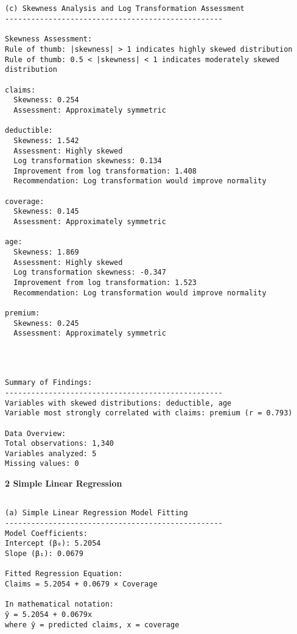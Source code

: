 \documentclass[8pt, twocolumn]{extarticle}
\begin{document}
    \begin{Verbatim}[commandchars=\\\{\}]


(c) Skewness Analysis and Log Transformation Assessment
--------------------------------------------------

Skewness Assessment:
Rule of thumb: |skewness| > 1 indicates highly skewed distribution
Rule of thumb: 0.5 < |skewness| < 1 indicates moderately skewed distribution

claims:
  Skewness: 0.254
  Assessment: Approximately symmetric

deductible:
  Skewness: 1.542
  Assessment: Highly skewed
  Log transformation skewness: 0.134
  Improvement from log transformation: 1.408
  Recommendation: Log transformation would improve normality

coverage:
  Skewness: 0.145
  Assessment: Approximately symmetric

age:
  Skewness: 1.869
  Assessment: Highly skewed
  Log transformation skewness: -0.347
  Improvement from log transformation: 1.523
  Recommendation: Log transformation would improve normality

premium:
  Skewness: 0.245
  Assessment: Approximately symmetric

    \end{Verbatim}

    \begin{center}
    \end{center}
    { \hspace*{\fill} \\}
    
    \begin{Verbatim}[commandchars=\\\{\}]

Summary of Findings:
--------------------------------------------------
Variables with skewed distributions: deductible, age
Variable most strongly correlated with claims: premium (r = 0.793)

Data Overview:
Total observations: 1,340
Variables analyzed: 5
Missing values: 0
    \end{Verbatim}
    \textbf{2 Simple Linear Regression}
    \begin{Verbatim}[commandchars=\\\{\}]

(a) Simple Linear Regression Model Fitting
--------------------------------------------------
Model Coefficients:
Intercept (β₀): 5.2054
Slope (β₁): 0.0679

Fitted Regression Equation:
Claims = 5.2054 + 0.0679 × Coverage

In mathematical notation:
ŷ = 5.2054 + 0.0679x
where ŷ = predicted claims, x = coverage
    \end{Verbatim}
\end{document}
